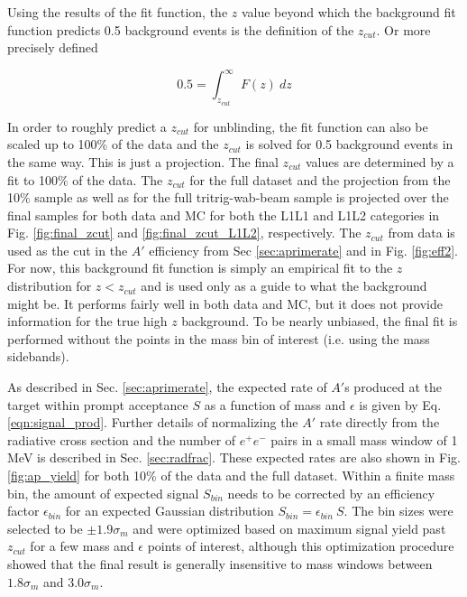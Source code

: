Using the results of the fit function, the $z$ value beyond which the background fit function predicts 0.5 background events is the definition of the $z_{cut}$. Or more precisely defined

\begin{equation}
    0.5=\int_{z_{cut}}^{\infty}F(z) \ dz
    \label{eqn:zcut}
\end{equation}

In order to roughly predict a $z_{cut}$ for unblinding, the fit function can also be scaled up to 100\% of the data and the $z_{cut}$ is solved for 0.5 background events in the same way. This is just a projection. The final $z_{cut}$ values are determined by a fit to 100\% of the data. The $z_{cut}$ for the full dataset and the projection from the 10\% sample as well as for the full tritrig-wab-beam sample is projected over the final samples for both data and MC for both the L1L1 and L1L2 categories in Fig. \ref{fig:final_zcut} and \ref{fig:final_zcut_L1L2}, respectively. The $z_{cut}$ from data is used as the cut in the $A'$ efficiency from Sec \ref{sec:aprimerate} and in Fig. \ref{fig:eff2}. %
For now, this background fit function is simply an empirical fit to the $z$ distribution for $z<z_{cut}$ and is used only as a guide to what the background might be. It performs fairly well in both data and MC, but it does not provide information for the true high $z$ background. To be nearly unbiased, the final fit is performed without the points in the mass bin of interest (i.e. using the mass sidebands). %

As described in Sec. \ref{sec:aprimerate}, the expected rate of $A'$s produced at the target within prompt acceptance $S$ as a function of mass and $\epsilon$ is given by Eq. \ref{eqn:signal_prod}. Further details of normalizing the $A'$ rate directly from the radiative cross section and the number of $e^+e^-$ pairs in a small mass window of 1 MeV is described in Sec. \ref{sec:radfrac}. These expected rates are also shown in Fig. \ref{fig:ap_yield} for both 10\% of the data and the full dataset. Within a finite mass bin, the amount of expected signal $S_{bin}$ needs to be corrected by an efficiency factor $\epsilon_{bin}$ for an expected Gaussian distribution $S_{bin}=\epsilon_{bin} \ S$. The bin sizes were selected to be $\pm 1.9\sigma_m$ and were optimized based on maximum signal yield past $z_{cut}$ for a few mass and $\epsilon$ points of interest, although this optimization procedure showed that the final result is generally insensitive to mass windows between $1.8\sigma_m$ and $3.0\sigma_m$.


